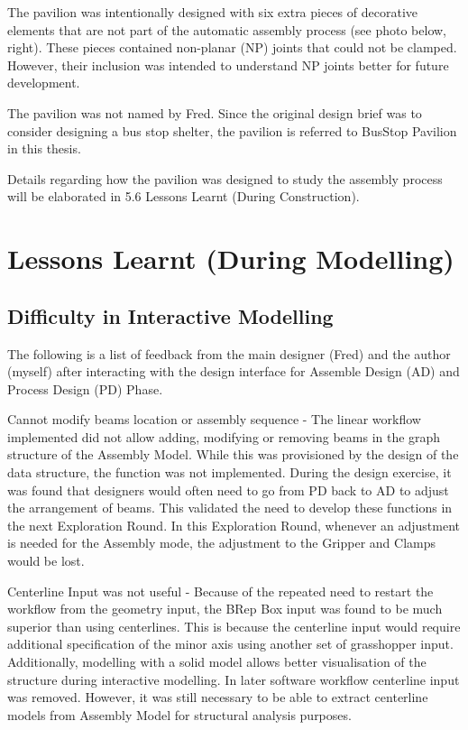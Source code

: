 The pavilion was intentionally designed with six extra pieces of decorative elements that are not part of the automatic assembly process (see photo below, right). These pieces contained non-planar (NP) joints that could not be clamped. However, their inclusion was intended to understand NP joints better for future development.
 
The pavilion was not named by Fred. Since the original design brief was to consider designing a bus stop shelter, the pavilion is referred to BusStop Pavilion in this thesis.

Details regarding how the pavilion was designed to study the assembly process will be elaborated in 5.6 Lessons Learnt (During Construction).

\section{Lessons Learnt (During Modelling)}
\label{section:exploration-2-lessons-learnt-during-modelling}

\subsection{Difficulty in Interactive Modelling}
\label{subsection:exploration-2-difficulty-in-interactive-modelling}

The following is a list of feedback from the main designer (Fred) and the author (myself) after interacting with the design interface for Assemble Design (AD) and Process Design (PD) Phase.

Cannot modify beams location or assembly sequence - The linear workflow implemented did not allow adding, modifying or removing beams in the graph structure of the Assembly Model. While this was provisioned by the design of the data structure, the function was not implemented. During the design exercise, it was found that designers would often need to go from PD back to AD to adjust the arrangement of beams. This validated the need to develop these functions in the next Exploration Round.  In this Exploration Round, whenever an adjustment is needed for the Assembly mode, the adjustment to the Gripper and Clamps would be lost.

Centerline Input was not useful - Because of the repeated need to restart the workflow from the geometry input, the BRep Box input was found to be much superior than using centerlines. This is because the centerline input would require additional specification of the minor axis using another set of grasshopper input. Additionally, modelling with a solid model allows better visualisation of the structure during interactive modelling. In later software workflow centerline input was removed. However, it was still necessary to be able to extract centerline models from Assembly Model for structural analysis purposes.

